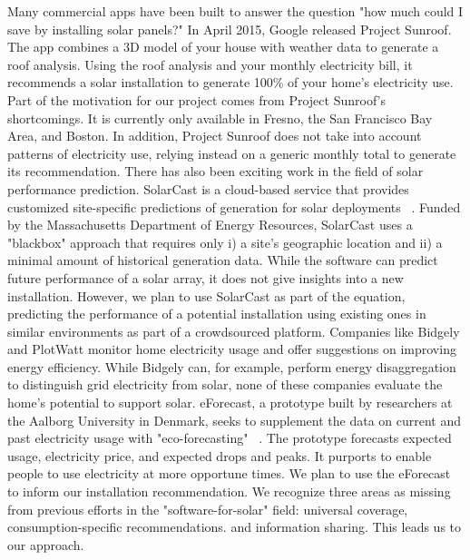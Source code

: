 \documentclass[pageno]{jpaper}
\begin{document}
\indent Many commercial apps have been built to answer the question "how much could I save by installing solar panels?" In April 2015, Google released Project Sunroof. The app combines a 3D model of your house with weather data to generate a roof analysis. Using the roof analysis and your monthly electricity bill, it recommends a solar installation to generate 100\% of your home's electricity use. Part of the motivation for our project comes from Project Sunroof's shortcomings. It is currently only available in Fresno, the San Francisco Bay Area, and Boston. In addition, Project Sunroof does not take into account patterns of electricity use, relying instead on a generic monthly total to generate its recommendation. \newline
\newline
\indent There has also been exciting work in the field of solar performance prediction. SolarCast is a cloud-based service that provides customized site-specific predictions of generation for solar deployments ~\cite{Iyengar:2014:SCB:2674061.2674071}. Funded by the Massachusetts Department of Energy Resources, SolarCast uses a "blackbox" approach that requires only i) a site's geographic location and ii) a minimal amount of historical generation data. While the software can predict future performance of a solar array, it does not give insights into a new installation. However, we plan to use SolarCast as part of the equation, predicting the performance of a potential installation using existing ones in similar environments as part of a crowdsourced platform. \newline
\newline
\indent Companies like Bidgely and PlotWatt monitor home electricity usage and offer suggestions on improving energy efficiency. While Bidgely can, for example, perform energy disaggregation to distinguish grid electricity from solar, none of these companies evaluate the home's potential to support solar. eForecast, a prototype built by researchers at the Aalborg University in Denmark, seeks to supplement the data on current and past electricity usage with "eco-forecasting" ~\cite{Kjeldskov:2015:EDE:2702123.2702318}. The prototype forecasts expected usage, electricity price, and expected drops and peaks. It purports to enable people to use electricity at more opportune times. We plan to use the eForecast to inform our installation recommendation. \newline
\newline
\indent We recognize three areas as missing from previous efforts in the "software-for-solar" field: universal coverage, consumption-specific recommendations. and information sharing. This leads us to our approach.
\end{document}
